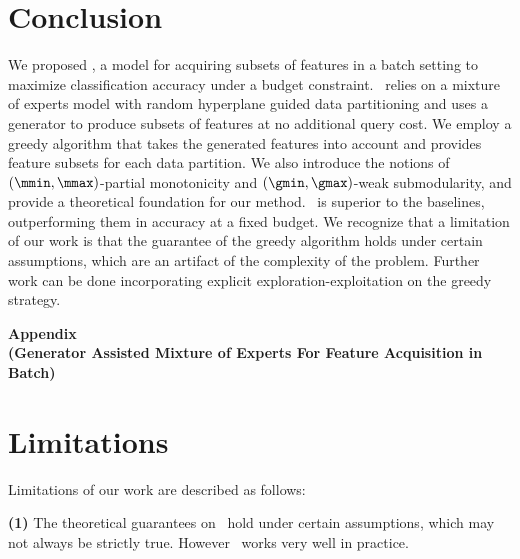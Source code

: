 \documentclass[letterpaper]{article}
\begin{document}
\section{Conclusion}
We proposed \our, a model for acquiring subsets of features in a batch setting to maximize classification accuracy under a budget constraint. \our\ relies on a mixture of experts model with random hyperplane guided data partitioning and uses a generator to produce subsets of features at no additional query cost. We employ a greedy algorithm that takes the generated features into account and provides feature subsets for each data partition. We also introduce the notions of $(\mmin, \mmax)$-partial monotonicity and $(\gmin, \gmax)$-weak submodularity, and provide a theoretical foundation for our method. \our\ is superior to the baselines, outperforming them in accuracy at a fixed budget. We recognize that a limitation of our work is that the guarantee of the greedy algorithm holds under certain assumptions, which are an artifact of the complexity of the problem. 
Further work can be done incorporating explicit exploration-exploitation on the greedy strategy.





\newpage
\appendix
\onecolumn

\begin{center}
    \Large { \bf Appendix \\
    \normalsize (Generator Assisted  Mixture of Experts   For Feature Acquisition in Batch)
    }
\end{center}

\section{Limitations}
\label{app:lim}
Limitations of our work are described as follows:

\textbf{(1)} The theoretical guarantees on \our\ hold under certain assumptions, which may not always be strictly true. However \our\ works very well in practice. 
\end{document}

